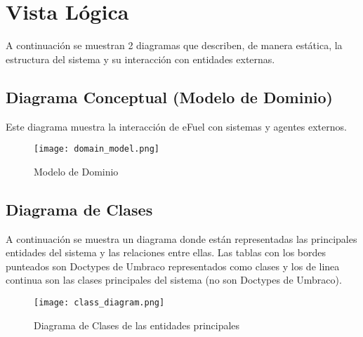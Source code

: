 \section{Vista Lógica} \label{vistaLogica}
A continuación se muestran 2 diagramas que describen, de manera estática, la estructura del sistema y su interacción con entidades externas.

\subsection{Diagrama Conceptual (Modelo de Dominio)}
Este diagrama muestra la interacción de eFuel con sistemas y agentes externos.

\begin{figure}[H]
    \texttt{[image: domain\_model.png]}
    \caption{Modelo de Dominio}
    \label{fig:domain_model}
    \centering
\end{figure}

\subsection{Diagrama de Clases}
A continuación se muestra un diagrama donde están representadas las principales entidades del sistema y las relaciones entre ellas. Las tablas con los bordes punteados son Doctypes de Umbraco representados como clases y los de linea continua son las clases principales del sistema (no son Doctypes de Umbraco).

\begin{figure}[H]
    \texttt{[image: class\_diagram.png]}
    \caption{Diagrama de Clases de las entidades principales}
    \label{fig:class_diagram_main}
    \centering
\end{figure}